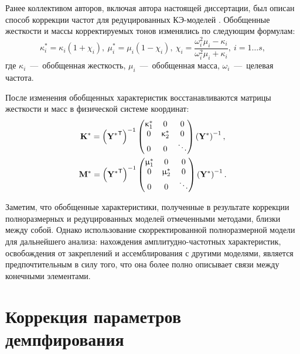 Ранее коллективом авторов, включая автора настоящей диссертации, был описан способ коррекции частот для редуцированных КЭ-моделей \cite{lib:author:reducedUpdating}. Обобщенные жесткости и массы корректируемых тонов изменялись по следующим формулам:
\begin{equation}
	\kappa_i ^ * = \kappa_i (1 + \chi_i), \ \mu_i ^ * = \mu_i (1 - \chi_i), \ \chi_i = \frac{\omega_i ^ 2 \mu_i - \kappa_i}{\omega_i ^ 2 \mu_i + \kappa_i}, \ i = 1 \hdots s, \label{eq:reducedGenParametersUpdating}
\end{equation}
где $ \kappa_i $~---~обобщенная жесткость, $ \mu_i $~---~обобщенная масса, $ \omega_i $~---~целевая частота.

После изменения обобщенных характеристик восстанавливаются матрицы жесткости и масс в физической системе координат:
\begin{equation}
	\begin{gathered}
		\mathbf{K} ^ \ast = 
		\left( \mathbf{Y ^ \ast} ^ \mathsf{T} \right) ^ {-1} 
		\begin{pmatrix}
			\upkappa_1 ^ \ast & 0 & 0 \\
			0 & \upkappa_2 ^ \ast & 0 \\
			0 & 0 & \ddots
		\end{pmatrix} 
		\left( \mathbf{Y} ^ \ast \right) ^ {-1}, \\
		\mathbf{M} ^ \ast = 
		\left( \mathbf{Y ^ \ast} ^ \mathsf{T} \right) ^ {-1} 
		\begin{pmatrix}
			\upmu_1 ^ \ast & 0 & 0 \\
			0 & \upmu_2 ^ \ast & 0 \\
			0 & 0 & \ddots
		\end{pmatrix}
		\left( \mathbf{Y} ^ \ast \right) ^ {-1}.
	\end{gathered}
	\label{eq:reducedStructuralMatrices}
\end{equation}

Заметим, что обобщенные характеристики, полученные в результате коррекции полноразмерных и редуцированных моделей отмеченными методами, близки между собой. Однако использование скорректированной полноразмерной модели для дальнейшего анализа: нахождения амплитудно-частотных характеристик, освобождения от закреплений и ассемблирования с другими моделями, является предпочтительным в силу того, что она более полно описывает связи между конечными элементами.

\section{Коррекция параметров демпфирования}

